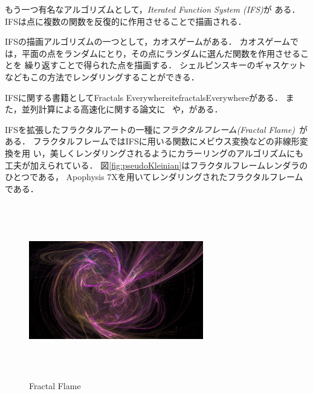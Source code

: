 もう一つ有名なアルゴリズムとして，{\it Iterated Function System (IFS)}が
ある．IFSは点に複数の関数を反復的に作用させることで描画される．

IFSの描画アルゴリズムの一つとして，カオスゲームがある．
カオスゲームでは，平面の点をランダムにとり，その点にランダムに選んだ関数を作用させることを
繰り返すことで得られた点を描画する．
シェルピンスキーのギャスケットなどもこの方法でレンダリングすることができる．

IFSに関する書籍としてFractals Everywhereite{fractalsEverywhere}がある．
また，並列計算による高速化に関する論文に
~\cite{2010_fractal_flames}や，\cite{Green:2005:GIF:1187112.1187128}がある．

IFSを拡張したフラクタルアートの一種に\emph{フラクタルフレーム}{\it(Fractal
Flame)}~\cite{draves2003fractal}がある．
フラクタルフレームではIFSに用いる関数にメビウス変換などの非線形変換を用
い，美しくレンダリングされるようにカラーリングのアルゴリズムにも工夫が加えられている．
図\ref{fig:pseudoKleinian}はフラクタルフレームレンダラのひとつである，
Apophysis 7Xを用いてレンダリングされたフラクタルフレームである．

\begin{figure}[htbp]
  \begin{center}
   \includegraphics[width=3in, height=3in, keepaspectratio]{../img/fractal/fractalFlame.pdf}
   \caption{Fractal Flame}
   \label{fig:fractalFlame}
  \end{center}
\end{figure}

\clearpage
